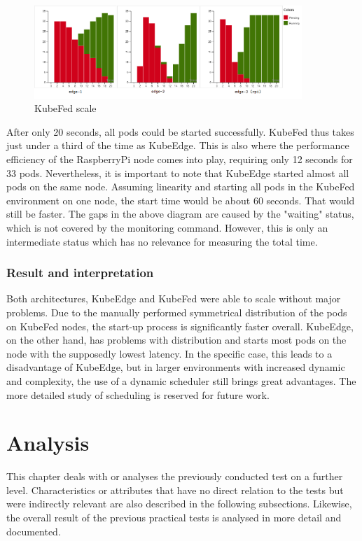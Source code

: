 \documentclass[MSC,Master,english]{twbook}%
\begin{document}
\begin{center}
    \begin{figure}[ht]
        \centering
        \includegraphics[width=0.9\textwidth]{PICs/kubefed-scale-100.png}
        \caption{KubeFed scale}
        \label{fig:kubefed-scale}
    \end{figure}
\end{center}
\par
After only 20 seconds, all pods could be started successfully. KubeFed thus takes just under a third of the time as KubeEdge. This is also where the performance efficiency of the RaspberryPi node comes into play, requiring only 12 seconds for 33 pods. Nevertheless, it is important to note that KubeEdge started almost all pods on the same node. Assuming linearity and starting all pods in the KubeFed environment on one node, the start time would be about 60 seconds. That would still be faster. The gaps in the above diagram are caused by the "waiting" status, which is not covered by the monitoring command. However, this is only an intermediate status which has no relevance for measuring the total time.

\subsubsection{Result and interpretation} 
Both architectures, KubeEdge and KubeFed were able to scale without major problems. Due to the manually performed symmetrical distribution of the pods on KubeFed nodes, the start-up process is significantly faster overall. KubeEdge, on the other hand, has problems with distribution and starts most pods on the node with the supposedly lowest latency. In the specific case, this leads to a disadvantage of KubeEdge, but in larger environments with increased dynamic and complexity, the use of a dynamic scheduler still brings great advantages. The more detailed study of scheduling is reserved for future work.

\section{Analysis}
\label{sec:dsranalysis}
This chapter deals with or analyses the previously conducted test on a further level. Characteristics or attributes that have no direct relation to the tests but were indirectly relevant are also described  in the following subsections. Likewise, the overall result of the previous practical tests is analysed in more detail and documented.
\end{document}
